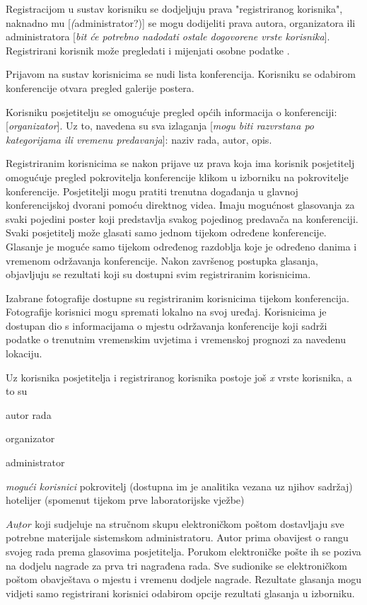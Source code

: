 		Registracijom u sustav korisniku se dodjeljuju prava "registriranog korisnika", naknadno mu [\textit(administrator?)] se mogu dodijeliti prava autora, organizatora ili administratora [\textit{bit će potrebno nadodati ostale dogovorene vrste korisnika}]. Registrirani korisnik može pregledati i mijenjati osobne podatke .
		
		Prijavom na sustav korisnicima se nudi lista konferencija. Korisniku se odabirom konferencije otvara pregled galerije postera.
		
		Korisniku posjetitelju se omogućuje pregled općih informacija o konferenciji: [\textit{organizator}]. Uz to, navedena su sva izlaganja [\textit{mogu biti razvrstana po kategorijama ili vremenu predavanja}]: naziv rada, autor, opis.  
		
		
		Registriranim korisnicima se nakon prijave uz prava koja ima korisnik posjetitelj omogućuje pregled pokrovitelja konferencije klikom u izborniku na pokrovitelje konferencije. Posjetitelji mogu pratiti trenutna događanja u glavnoj konferencijskoj dvorani pomoću direktnog videa. Imaju mogućnost glasovanja za svaki pojedini poster koji predstavlja svakog pojedinog predavača na konferenciji. Svaki posjetitelj može glasati samo jednom tijekom određene konferencije. Glasanje je moguće samo tijekom određenog razdoblja koje je određeno danima i vremenom održavanja konferencije. Nakon završenog postupka glasanja, objavljuju se rezultati koji su dostupni svim registriranim korisnicima. 
		
		Izabrane fotografije dostupne su registriranim korisnicima tijekom konferencija. Fotografije korisnici mogu spremati lokalno na svoj uređaj. 
		Korisnicima je dostupan dio s informacijama o mjestu održavanja konferencije koji sadrži podatke o trenutnim vremenskim uvjetima i vremenskoj prognozi za navedenu lokaciju.
		
		Uz korisnika posjetitelja i registriranog korisnika postoje još \textit{x} vrste korisnika, a to su
		\begin{packed_item}
			\item autor rada
			\item organizator
			\item administrator
			\item \textit{mogući korisnici}
			\subitem pokrovitelj (dostupna im je analitika vezana uz njihov sadržaj)
			\subitem hotelijer (spomenut tijekom prve laboratorijske vježbe)
		\end{packed_item}
		
		$\underline{Autor}$ koji sudjeluje na stručnom skupu elektroničkom poštom dostavljaju sve potrebne materijale sistemskom administratoru. Autor prima obavijest o rangu svojeg rada prema glasovima posjetitelja. Porukom elektroničke pošte ih se poziva na dodjelu nagrade za prva tri nagrađena rada. Sve sudionike se elektroničkom poštom obavještava o mjestu i vremenu dodjele nagrade. Rezultate glasanja mogu vidjeti samo registrirani korisnici odabirom opcije rezultati glasanja u izborniku.
		
